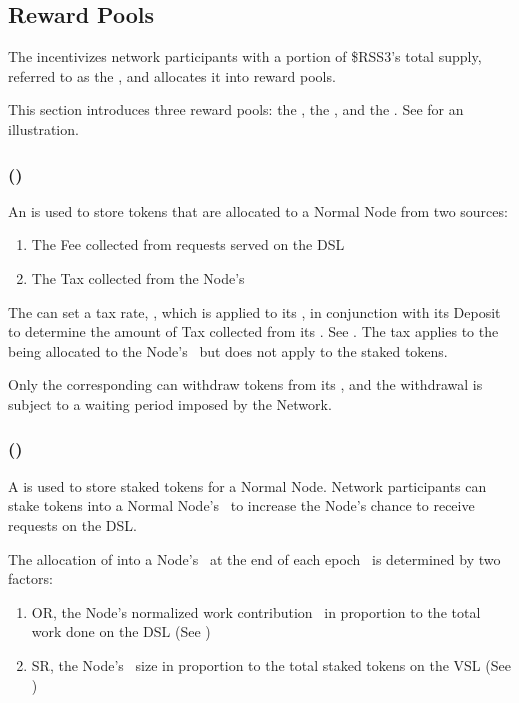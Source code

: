 \subsection{Reward Pools}
\label{subsec:reward_pools}

The  incentivizes network participants with a portion of \$RSS3's total supply, referred to as the , and allocates it into reward pools.

This section introduces three reward pools: the , the , and the . See  for an illustration.

\subsubsection{ (\operationPool)}
\label{subsubsec:operation_pool}

An  is used to store tokens that are allocated to a Normal Node from two sources:
\begin{enumerate}
    \item The \gls{Fee} collected from requests served on the \gls{DSL}
    \item The \gls{Tax} collected from the Node's \stakingPool
\end{enumerate}

The  can set a tax rate, \taxRate, which is applied to its \stakingPool, in conjunction with its \gls{Deposit} to determine the amount of \gls{Tax} collected from its \stakingPool.
See .
The tax applies to the  being allocated to the Node's \stakingPool\ but does not apply to the staked tokens.

Only the corresponding  can withdraw tokens from its \operationPool, and the withdrawal is subject to a waiting period imposed by the Network.

\subsubsection{ (\stakingPool)}
\label{subsubsec:staking_pool}

A  is used to store staked tokens for a Normal Node. Network participants can stake tokens into a Normal Node's \stakingPool\ to increase the Node's chance to receive requests on the \gls{DSL}.

The allocation of  into a Node's \stakingPool\ at the end of each epoch \epoch\ is determined by two factors:
\begin{enumerate}
    \item \gls{OR}, the Node's normalized work contribution \work\ in proportion to the total work done on the \gls{DSL} (See )
    \item \gls{SR}, the Node's \stakingPool\ size in proportion to the total staked tokens on the \gls{VSL} (See )
\end{enumerate}

